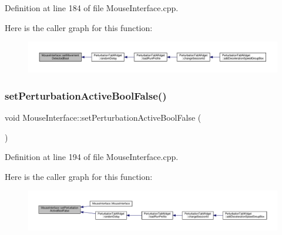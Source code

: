 Definition at line 184 of file Mouse\+Interface.\+cpp.

Here is the caller graph for this function\+:
\nopagebreak
\begin{figure}[H]
\begin{center}
\leavevmode
\includegraphics[width=350pt]{class_mouse_interface_a51ed7e2eaaacd6f471c93c2537fa228c_icgraph}
\end{center}
\end{figure}
\mbox{\label{class_mouse_interface_a6c0c368eecb5642747fab25d426fb774}} 
\subsubsection{\texorpdfstring{set\+Perturbation\+Active\+Bool\+False()}{setPerturbationActiveBoolFalse()}}
{\footnotesize\ttfamily void Mouse\+Interface\+::set\+Perturbation\+Active\+Bool\+False (\begin{DoxyParamCaption}{ }\end{DoxyParamCaption})}



Definition at line 194 of file Mouse\+Interface.\+cpp.

Here is the caller graph for this function\+:
\nopagebreak
\begin{figure}[H]
\begin{center}
\leavevmode
\includegraphics[width=350pt]{class_mouse_interface_a6c0c368eecb5642747fab25d426fb774_icgraph}
\end{center}
\end{figure}
\mbox{\label{class_mouse_interface_a0d37a6e4edbdec54ddabf1e71afae796}} 
